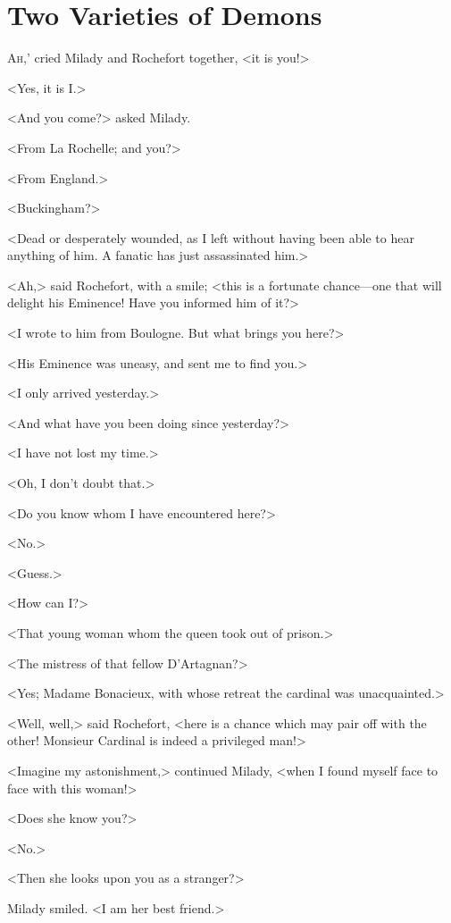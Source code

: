 
\chapter{Two Varieties of Demons}

\lettrine[,ante=`]{A}{h,}' cried Milady and Rochefort together, <it is you!> 

\zz
<Yes, it is I.> 

\zz
<And you come?> asked Milady. 

\zz
<From La Rochelle; and you?> 

\zz
<From England.> 

<Buckingham?> 

<Dead or desperately wounded, as I left without having been able to hear anything of him. A fanatic has just assassinated him.> 

<Ah,> said Rochefort, with a smile; <this is a fortunate chance—one that will delight his Eminence! Have you informed him of it?> 

<I wrote to him from Boulogne. But what brings you here?> 

<His Eminence was uneasy, and sent me to find you.> 

<I only arrived yesterday.> 

<And what have you been doing since yesterday?> 

<I have not lost my time.> 

<Oh, I don't doubt that.> 

<Do you know whom I have encountered here?> 

<No.> 

<Guess.> 

<How can I?> 

<That young woman whom the queen took out of prison.> 

<The mistress of that fellow D'Artagnan?> 

<Yes; Madame Bonacieux, with whose retreat the cardinal was unacquainted.> 

<Well, well,> said Rochefort, <here is a chance which may pair off with the other! Monsieur Cardinal is indeed a privileged man!> 

<Imagine my astonishment,> continued Milady, <when I found myself face to face with this woman!> 

<Does she know you?> 

<No.> 

<Then she looks upon you as a stranger?> 

Milady smiled. <I am her best friend.> 

